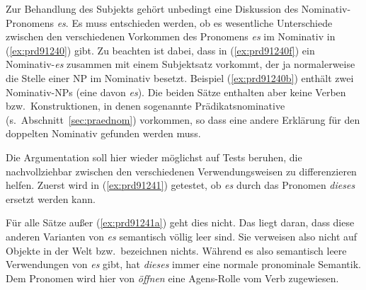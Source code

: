 \label{sec:expletiva}

Zur Behandlung des Subjekts gehört unbedingt eine Diskussion des Nominativ-Pronomens \textit{es}.
Es muss entschieden werden, ob es wesentliche Unterschiede zwischen den verschiedenen Vorkommen des Pronomens \textit{es} im Nominativ in (\ref{ex:prd91240}) gibt.
Zu beachten ist dabei, dass in (\ref{ex:prd91240f}) ein Nominativ-\textit{es} zusammen mit einem Subjektsatz vorkommt, der ja normalerweise die Stelle einer NP im Nominativ besetzt.
Beispiel (\ref{ex:prd91240b}) enthält zwei Nominativ-NPs (eine davon \textit{es}). 
Die beiden Sätze enthalten aber keine Verben bzw.\ Konstruktionen, in denen sogenannte Prädikatsnominative (s.\ Abschnitt~\ref{sec:praednom}) vorkommen, so dass eine andere Erklärung für den doppelten Nominativ gefunden werden muss.

\begin{exe}
  \ex\label{ex:prd91240}
  \begin{xlist}
  \end{xlist}
\end{exe}

Die Argumentation soll hier wieder möglichst auf Tests beruhen, die nachvollziehbar zwischen den verschiedenen Verwendungsweisen zu differenzieren helfen.
Zuerst wird in (\ref{ex:prd91241}) getestet, ob \textit{es} durch das Pronomen \textit{dieses} ersetzt werden kann.

\begin{exe}
  \ex\label{ex:prd91241}
  \begin{xlist}
  \end{xlist}
\end{exe}

Für alle Sätze außer (\ref{ex:prd91241a}) geht dies nicht.
Das liegt daran, dass diese anderen Varianten von \textit{es} semantisch völlig leer sind.
Sie verweisen also nicht auf Objekte in der Welt bzw.\ bezeichnen nichts.
Während es also semantisch leere Verwendungen von \textit{es} gibt, hat \textit{dieses} immer eine normale pronominale Semantik.
Dem Pronomen wird hier von \textit{öffnen} eine Agens-Rolle vom Verb zugewiesen.

